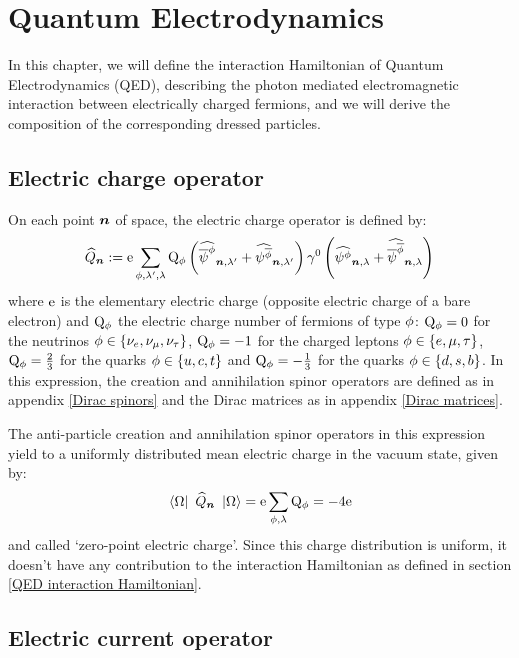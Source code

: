 \chapter{Quantum Electrodynamics}
\label{Quantum Electrodynamics}

In this chapter, we will define the interaction Hamiltonian of Quantum Electrodynamics (QED), describing the photon mediated electromagnetic interaction between electrically charged fermions, and we will derive the composition of the corresponding dressed particles.

\section{Electric charge operator}
\label{Electric charge operator}

On each point $\boldsymbol{n}$ of space, the electric charge operator is defined by:
\begin{equation*}
\widehat{Q}_{\boldsymbol{n}} := \mathrm e \sum_{\phi,\lambda',\lambda} \mathrm Q_{\phi} \left( \widehat{\overline \psi^{\phi}}_{{\boldsymbol{n}}, {\lambda'}} + \widehat{\psi^{\overline{\phi}}}_{{\boldsymbol{n}}, {\lambda'}} \right) \gamma^{0} \left( \widehat{\psi^{\phi}}_{{\boldsymbol{n}}, {\lambda}} + \widehat{\overline \psi^{\overline{\phi}}}_{{\boldsymbol{n}}, {\lambda}} \right)
\end{equation*}
where $\mathrm e$ is the elementary electric charge (opposite electric charge of a bare electron) and $\mathrm Q_{\phi}$ the electric charge number of fermions of type $\phi$: $\mathrm Q_{\phi} = 0$ for the neutrinos $\phi \in \{ \nu_{e}, \nu_{\mu}, \nu_{\tau} \}$, $\mathrm Q_{\phi} = -1$ for the charged leptons $\phi \in \{ e, \mu, \tau \}$, $\mathrm Q_{\phi} = \frac 2 3$ for the quarks $\phi \in \{ u, c, t \}$ and $\mathrm Q_{\phi} = - \frac 1 3$ for the quarks $\phi \in \{ d, s, b \}$. In this expression, the creation and annihilation spinor operators are defined as in appendix \ref{Dirac spinors} and the Dirac matrices as in appendix \ref{Dirac matrices}.

The anti-particle creation and annihilation spinor operators in this expression yield to a uniformly distributed mean electric charge in the vacuum state, given by:
\begin{equation*}
\left\langle{\Omega}\right|\  \widehat{Q}_{\boldsymbol{n}} \ \left|{\Omega}\right\rangle = \mathrm e \sum_{\phi,\lambda} \mathrm Q_{\phi} = - 4 \mathrm e
\end{equation*}
and called `zero-point electric charge'. Since this charge distribution is uniform, it doesn't have any contribution to the interaction Hamiltonian as defined in section \ref{QED interaction Hamiltonian}.

\section{Electric current operator}

